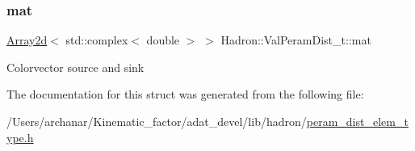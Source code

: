 \subsubsection{\texorpdfstring{mat}{mat}}
{\footnotesize\ttfamily \mbox{\hyperlink{classXMLArray_1_1Array2d}{Array2d}}$<$ std\+::complex$<$ double $>$ $>$ Hadron\+::\+Val\+Peram\+Dist\+\_\+t\+::mat}

Colorvector source and sink 

The documentation for this struct was generated from the following file\+:\begin{DoxyCompactItemize}
\item 
/\+Users/archanar/\+Kinematic\+\_\+factor/adat\+\_\+devel/lib/hadron/\mbox{\hyperlink{lib_2hadron_2peram__dist__elem__type_8h}{peram\+\_\+dist\+\_\+elem\+\_\+type.\+h}}\end{DoxyCompactItemize}
